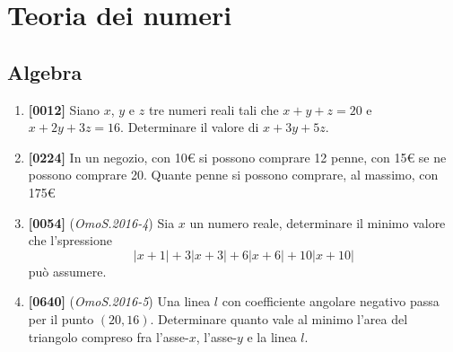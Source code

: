 \documentclass[10pt]{article}
\begin{document}
\newpage
\section{Teoria dei numeri}

\subsection{Algebra}
\begin{enumerate}
    \item \textbf{[0012]} Siano $x$, $y$ e $z$ tre numeri reali tali che $x+y+z=20$ e $x+2y+3z=16$. Determinare il valore di $x+3y+5z$.

    \item \textbf{[0224]} In un negozio, con 10€ si possono comprare 12 penne, con 15€ se ne possono comprare 20. Quante penne si possono comprare, al massimo, con 175€

    \item \textbf{[0054]} (\textit{OmoS.2016-4}) Sia $x$ un numero reale, determinare il minimo valore che l'spressione
    \begin{equation*}
        \lvert x+1 \rvert+3\lvert x+3 \rvert +6\lvert x+6 \rvert +10\lvert x+10\rvert
    \end{equation*}
    può assumere.

    \item \textbf{[0640]} (\textit{OmoS.2016-5}) Una linea $l$ con coefficiente angolare negativo passa per il punto $(20,16)$. Determinare quanto vale al minimo l'area del triangolo compreso fra l'asse-$x$, l'asse-$y$ e la linea $l$.
\end{enumerate}
\end{document}
